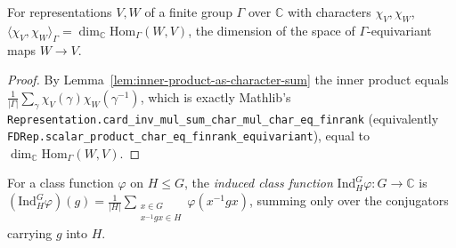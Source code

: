 \begin{lemma}
    \label{lem:inner-product-eq-dim-hom}
    \leanok
    For representations $V, W$ of a finite group $\Gamma$ over $\mathbb{C}$ with
    characters $\chi_V, \chi_W$,
    $\langle \chi_V, \chi_W \rangle_\Gamma = \dim_{\mathbb{C}}
    \mathrm{Hom}_\Gamma(W, V)$, the dimension of the space of $\Gamma$-equivariant
    maps $W \to V$.
\end{lemma}
\begin{proof}
    By Lemma~\ref{lem:inner-product-as-character-sum} the inner product equals
    $\frac{1}{|\Gamma|}\sum_\gamma \chi_V(\gamma)\chi_W(\gamma^{-1})$, which is
    exactly Mathlib's \texttt{Representation.card\_inv\_mul\_sum\_char\_mul\_char\_eq\_finrank}
    (equivalently \texttt{FDRep.scalar\_product\_char\_eq\_finrank\_equivariant}),
    equal to $\dim_{\mathbb{C}}\mathrm{Hom}_\Gamma(W,V)$.
\end{proof}

\begin{definition}
    \label{def:induced-class-function}
    \leanok
    For a class function $\varphi$ on $H \le G$, the \emph{induced class
    function} $\mathrm{Ind}_H^G \varphi : G \to \mathbb{C}$ is
    $(\mathrm{Ind}_H^G \varphi)(g) = \frac{1}{|H|} \sum_{\substack{x \in G \\
    x^{-1} g x \in H}} \varphi(x^{-1} g x)$,
    summing only over the conjugators carrying $g$ into $H$.
\end{definition}


